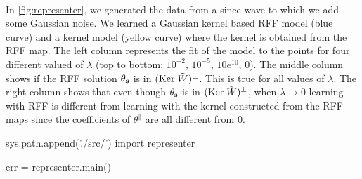 \documentclass[twoside,11pt]{article}
\begin{document}
\paragraph{}
In \cref{fig:representer}, we generated the data from a since wave to which we
add some Gaussian noise. We learned a Gaussian kernel based \ac{RFF} model
(blue curve) and a kernel model (yellow curve) where the kernel is obtained
from the \acs{RFF} map. The left column represents the fit of the model to the
points for four different valued of $\lambda$ (top to bottom: $10^{-2}$,
$10^{-5}$, $10e^{10}$, $0$). The middle column shows if the \acs{RFF} solution
$\theta_{\boldsymbol{\mathbf{s}}}$ is in $(\text{Ker}\; \tilde{W})^\perp$.  This is true for all values
of $\lambda$. The right column shows that even though $\theta_{\boldsymbol{\mathbf{s}}}$ is in
$(\text{Ker}\; \tilde{W})^\perp$, when $\lambda\to0$ learning with \acs{RFF} is
different from learning with the kernel constructed from the \acs{RFF} maps
since the coefficients of $\theta^{\parallel}$ are all different from $0$.

\begin{pycode}[representer]
sys.path.append('./src/')
import representer

err = representer.main()
\end{pycode}



\end{document}
